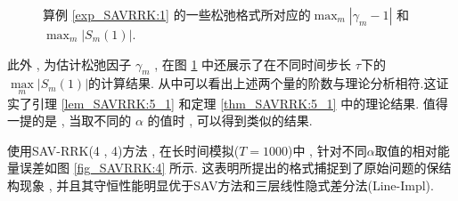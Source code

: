 \begin{figure}[H]
	\begin{center}
	\caption{算例 \ref{exp_SAVRRK:1} 的一些松弛格式所对应的$\max_m\left|\gamma_m-1\right|$ 和 $\max_m\left|S_m(1)\right|$.}
	\label{fig_SAVRRK:1}
	\end{center}
	\end{figure}

	此外 , 为估计松弛因子 $\gamma_m$ , 在图 \ref{fig_SAVRRK:1} 中还展示了在不同时间步长 $\tau$下的 $\max\limits _m\left|S_m(1)\right|$的计算结果.
	从中可以看出上述两个量的阶数与理论分析相符.这证实了引理 \ref{lem_SAVRRK:5_1} 和定理 \ref{thm_SAVRRK:5_1} 中的理论结果.
	值得一提的是 , 当取不同的 $\alpha$ 的值时 , 可以得到类似的结果.%
	
	使用SAV-RRK(4 , 4)方法 , 在长时间模拟($T=1000$)中 , 针对不同$\alpha$取值的相对能量误差如图 \ref{fig_SAVRRK:4} 所示.
	这表明所提出的格式捕捉到了原始问题的保结构现象 , 并且其守恒性能明显优于SAV方法\cite{chengConvergenceEnergyconservingScheme2022}和三层线性隐式差分法(Line-Impl)\cite{wangConservativeLinearizedDifference2015}.
			
